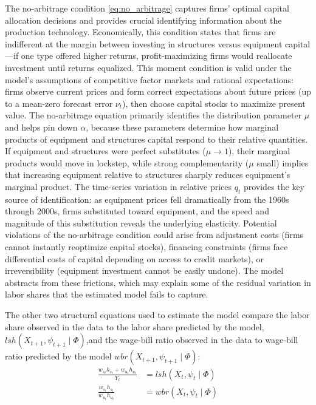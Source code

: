\documentclass[12pt]{article}
\begin{document}
The no-arbitrage condition \eqref{eq:no_arbitrage} captures firms' optimal capital allocation decisions and provides crucial identifying information about the production technology. Economically, this condition states that firms are indifferent at the margin between investing in structures versus equipment capital---if one type offered higher returns, profit-maximizing firms would reallocate investment until returns equalized. This moment condition is valid under the model's assumptions of competitive factor markets and rational expectations: firms observe current prices and form correct expectations about future prices (up to a mean-zero forecast error $\nu_t$), then choose capital stocks to maximize present value. The no-arbitrage equation primarily identifies the distribution parameter $\mu$ and helps pin down $\alpha$, because these parameters determine how marginal products of equipment and structures capital respond to their relative quantities. If equipment and structures were perfect substitutes ($\mu \to 1$), their marginal products would move in lockstep, while strong complementarity ($\mu$ small) implies that increasing equipment relative to structures sharply reduces equipment's marginal product. The time-series variation in relative prices $q_t$ provides the key source of identification: as equipment prices fell dramatically from the 1960s through 2000s, firms substituted toward equipment, and the speed and magnitude of this substitution reveals the underlying elasticity. Potential violations of the no-arbitrage condition could arise from adjustment costs (firms cannot instantly reoptimize capital stocks), financing constraints (firms face differential costs of capital depending on access to credit markets), or irreversibility (equipment investment cannot be easily undone). The model abstracts from these frictions, which may explain some of the residual variation in labor shares that the estimated model fails to capture.

The other two structural equations used to estimate the model compare the labor share observed in the data to the labor share predicted by the model, $lsh(X_{t+1}, \psi_{t+1} \mid \Phi )$,and the wage-bill ratio observed in the data to wage-bill ratio predicted by the model $wbr(X_{t+1}, \psi_{t+1} \mid \Phi )$:
\begin{align}
 \frac{w_{s_t}h_{s_t} + w_{u_t}h_{u_t} }{Y_t} &= lsh(X_{t}, \psi_{t} \mid \Phi ) \label{eq:labor_share}\\
 \frac{w_{s_t}h_{s_t}}{w_{u_t}h_{u_t}} &= wbr(X_{t}, \psi_{t} \mid \Phi ) \label{eq:wage_bill_ratio}
\end{align}
\end{document}
